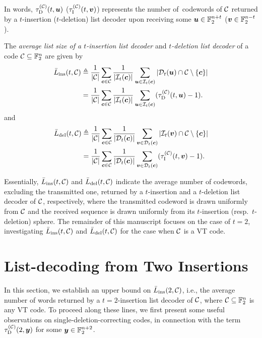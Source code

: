\documentclass[conference, a4paper]{IEEEtran}
\begin{document}
In words, $\tau_{\mathrm{D}}^{(\mathcal{C})}(t,{\boldsymbol u})$ ($\tau_{\mathrm{I}}^{(\mathcal{C})}(t,{\boldsymbol v})$) represents the number of~codewords of $\mathcal{C}$ returned by a $t$-insertion ($t$-deletion) list decoder upon receiving some ${\boldsymbol u} \in \mathbb{F}_2^{n+t}$ (${\boldsymbol v} \in \mathbb{F}_2^{n-t}$).

\begin{definition} \label{eq::def-li}
\label{eq::def-ld}
    The \emph{average list size of a $t$-insertion list decoder} and \emph{$t$-deletion list decoder} of a code $\mathcal{C} \subseteq \mathbb{F}_2^n$ are given by
    \begin{align}
    \bar{L}_\mathrm{ins}(t,\mathcal{C}) &\triangleq \frac{1}{|\mathcal{C}|} \sum_{{\boldsymbol c} \in \mathcal{C}} \frac{1}{|\mathcal{I}_{t}({\boldsymbol c})|} \sum_{{\boldsymbol u} \in \mathcal{I}_{t}({\boldsymbol c})} |\mathcal{D}_{t}({\boldsymbol u}) \cap \mathcal{C} \setminus \{{\boldsymbol c}\}| \nonumber \\
    &= \frac{1}{|\mathcal{C}|} \sum_{{\boldsymbol c} \in \mathcal{C}} \frac{1}{|\mathcal{I}_{t}({\boldsymbol c})|} \sum_{{\boldsymbol u} \in \mathcal{I}_{t}({\boldsymbol c})}(\tau_{\mathrm{D}}^{(\mathcal{C})}(t,{\boldsymbol u}) - 1). \nonumber
\end{align}
and
\begin{align}
        \bar{L}_\mathrm{del}(t,\mathcal{C}) &\triangleq \frac{1}{|\mathcal{C}|} \sum_{{\boldsymbol c} \in \mathcal{C}} \frac{1}{|\mathcal{D}_{t}({\boldsymbol c})|} \sum_{{\boldsymbol v} \in \mathcal{D}_{t}({\boldsymbol c})} |\mathcal{I}_{t}({\boldsymbol v}) \cap \mathcal{C} \setminus \{{\boldsymbol c}\}| \nonumber \\
        &= \frac{1}{|\mathcal{C}|} \sum_{{\boldsymbol c} \in \mathcal{C}} \frac{1}{|\mathcal{D}_{t}({\boldsymbol c})|} \sum_{{\boldsymbol v} \in \mathcal{D}_{t}({\boldsymbol c})} (\tau_{\mathrm{I}}^{(\mathcal{C})}(t,{\boldsymbol v}) - 1).  \nonumber
    \end{align} 
\end{definition}


Essentially, $\bar{L}_\mathrm{ins}(t,\mathcal{C})$ and $\bar{L}_\mathrm{del}(t,\mathcal{C})$ indicate the average number of codewords, excluding the transmitted one, returned by a $t$-insertion and a $t$-deletion list decoder of $\mathcal{C}$, respectively, where the transmitted codeword is drawn uniformly from $\mathcal{C}$ and the received sequence is drawn uniformly from its $t$-insertion (resp.\ $t$-deletion) sphere. The remainder of this manuscript focuses on the case of $t=2$, investigating $\bar{L}_\mathrm{ins}(t,\mathcal{C})$ and $\bar{L}_\mathrm{del}(t,\mathcal{C})$ for the case when $\mathcal{C}$ is a VT code. 

\section{List-decoding from Two Insertions}

In this section, we establish an upper bound on $\bar{L}_\mathrm{ins}(2,\mathcal{C})$, i.e., the average number of words returned by a $t=2$-insertion list decoder of $\mathcal{C}$, where $\mathcal{C} \subseteq \mathbb{F}_2^n$ is any VT code. To proceed along these lines, we first present some useful observations on single-deletion-correcting codes, in connection with the term $\tau_{\mathrm{D}}^{(\mathcal{C})}(2,{\boldsymbol y})$ for some ${\boldsymbol y} \in \mathbb{F}_2^{n+2}$.
\end{document}
